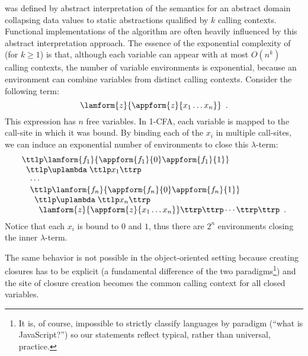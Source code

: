\kCFA{} was defined by abstract interpretation of the \lc{} semantics for
an abstract domain collapsing data values to static abstractions
qualified by $k$ calling contexts. Functional implementations of the
algorithm are often heavily influenced by this abstract interpretation
approach.  The essence of the exponential complexity of \kCFA{} (for
$k \geq 1$) is that, although each variable can appear with at most
$O(n^{k})$ calling contexts, the number of variable environments is
exponential, because an environment can combine variables from
distinct calling contexts.  Consider the following term:
\begin{displaymath}
\lamform{z}{\appform{z}{x_1 \ldots x_n}}\enspace\text.
\end{displaymath}
This expression has $n$ free variables.  In 1-CFA, each variable is
mapped to the call-site in which it was bound.  By binding each of the
$x_i$ in multiple call-sites, we can induce an exponential number of
environments to close this $\lambda$-term:
\begin{displaymath}
\begin{array}{l}
\ttlp\lamform{f_1}{\appform{f_1}{0} \appform{f_1}{1}}\\
\mbox{\tt{\ }}\ttlp\uplambda\;\ttlp x_1\ttrp\\
\quad\cdots\\
\quad\ttlp\lamform{f_n}{\appform{f_n}{0} \appform{f_n}{1}}\\
\quad\mbox{\tt{\ }}\ttlp\uplambda\;\ttlp x_n\ttrp\; \\
\quad\mbox{\tt{\ \ }}\lamform{z}{\appform{z}{x_1 \ldots x_n}}\ttrp\ttrp\cdots\ttrp\ttrp\enspace\text.
\end{array}
\end{displaymath}
Notice that each $x_i$ is bound to $0$ and $1$, thus there are $2^n$
environments closing the inner $\lambda$-term.

The same behavior is not possible in the object-oriented setting
because creating closures has to be explicit (a fundamental difference
of the two paradigms\footnote{It is, of course, impossible to strictly
classify languages by paradigm (``what is JavaScript?'') so our
statements reflect typical, rather than universal, practice.}) and the
site of closure creation becomes the common calling context for all
closed variables.

